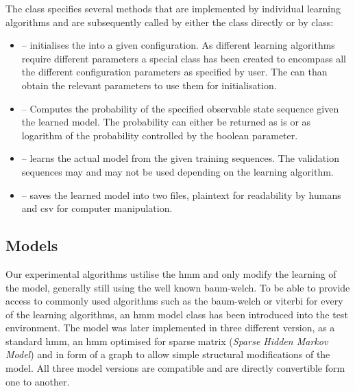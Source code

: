 The  class specifies several methods that are implemented by individual learning algorithms and are subsequently called by either the  class directly or by  class:

\begin{itemize}
	\item[]  -- initialises the  into a given configuration. As different learning algorithms require different parameters a special class  has been created to encompass all the different configuration parameters as specified by user. The  can than obtain the relevant parameters to use them for initialisation.
	\item[]  -- Computes the probability of the specified observable state sequence given the learned model. The probability can either be returned as is or as logarithm of the probability controlled by the boolean  parameter.
	\item[]  -- learns the actual model from the given training sequences. The validation sequences may and may not be used depending on the learning algorithm.
	\item[]  -- saves the learned model into two files, plaintext for readability by humans and \gls{csv} for computer manipulation.
\end{itemize}

\subsection{Models}

Our experimental algorithms ustilise the \acrlong{hmm} and only modify the learning of the model, generally still using the well known \gls{baum-welch}. To be able to provide access to commonly used algorithms such as the \gls{baum-welch} or \gls{viterbi} for every of the learning algorithms, an \gls{hmm} model class has been introduced into the test environment. The model was later implemented in three different version, as a standard \gls{hmm}, an \gls{hmm} optimised for sparse matrix (\emph{Sparse Hidden Markov Model}) and in form of a graph to allow simple structural modifications of the model. All three model versions are compatible and are directly convertible form one to another.

